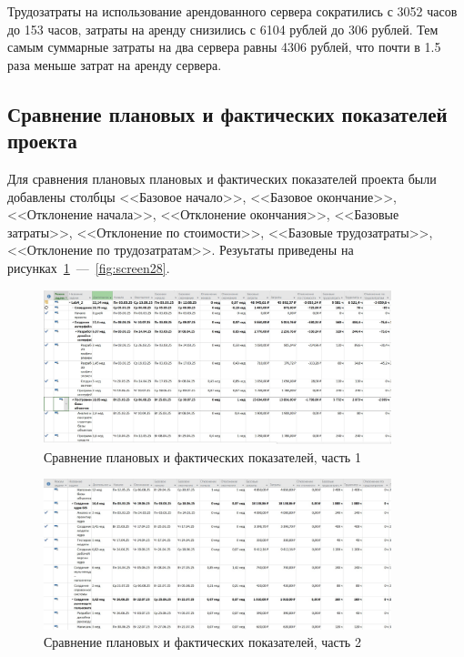 Трудозатраты на использование арендованного сервера сократились с 3052 часов до 153 часов, затраты на аренду снизились с 6104 рублей до 306 рублей. 
Тем самым суммарные затраты на два сервера равны 4306 рублей, что почти в 1.5 раза меньше затрат на аренду сервера.

\subsection{Сравнение плановых и фактических показателей проекта}

Для сравнения плановых плановых и фактических показателей проекта были добавлены столбцы <<Базовое начало>>, <<Базовое окончание>>, <<Отклонение начала>>, <<Отклонение окончания>>, <<Базовые затраты>>, <<Отклонение по стоимости>>, <<Базовые трудозатраты>>, <<Отклонение по трудозатратам>>.
Резуьтаты приведены на рисунках~\ref{fig:screen26}~---~\ref{fig:screen28}.

\begin{figure}[H]
	\centering
	\includegraphics[width=0.9\textwidth]{img/lab4/screen26.jpg}
	\caption{Сравнение плановых и фактических показателей, часть 1}
	\label{fig:screen26}
\end{figure}

\begin{figure}[H]
	\centering
	\includegraphics[width=0.9\textwidth]{img/lab4/screen27.jpg}
	\caption{Сравнение плановых и фактических показателей, часть 2}
	\label{fig:screen27}
\end{figure}

